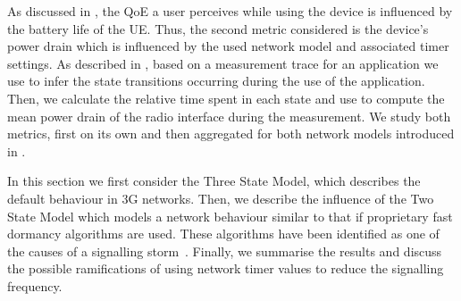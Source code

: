 As discussed in , the \gls{QoE} a user perceives while using the device is influenced by the battery life of the \gls{UE}.
Thus, the second metric considered is the device’s power drain which is influenced by the used network model and associated timer settings.
As described in , based on a measurement trace for an application we use  to infer the state transitions occurring during the use of the application.
Then, we calculate the relative time spent in each state and use  to compute the mean power
drain of the radio interface during the measurement.
We study both metrics, first on its own and then aggregated for both network models introduced in .

In this section we first consider the Three State Model, which describes the default behaviour in \gls{3G} networks.
Then, we describe the influence of the Two State Model which models a network behaviour similar to that if proprietary fast dormancy algorithms are used.
These algorithms have been identified as one of the causes of a signalling storm~\cite{NSN2011}.
Finally, we summarise the results and discuss the possible ramifications of using network timer values to reduce the signalling frequency.

